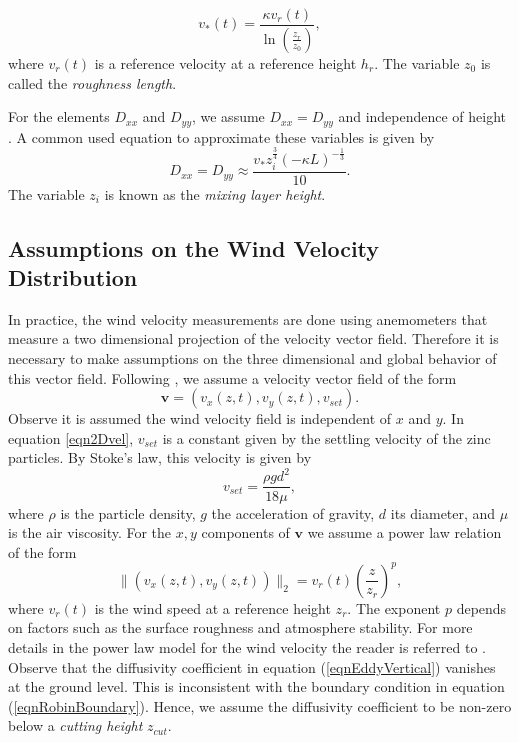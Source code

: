 \documentclass[12pt]{book}
\newcommand{\vv}{\textbf{v}}
\begin{document}
\begin{equation*}
v_{*}(t)=\frac{\kappa v_{r}(t)}{\ln(\frac{z_{r}}{z_{0}})},
\end{equation*}
where $v_{r}(t)$ is a reference velocity at a reference height $h_{r}$. The variable $z_{0}$ 
is called the \textit{roughness length}. 

For the elements $D_{xx}$ and $D_{yy}$, we assume $D_{xx}=D_{yy}$ and independence of height 
\cite{monin1954basic}. A common used equation
to approximate these variables is given by
\begin{equation*}
D_{xx}=D_{yy}\approx \frac{v_{*}z_{i}^{\frac{3}{4}}(-\kappa L)^{-\frac{1}{3}}}{10}.
\end{equation*}
The variable $z_{i}$ is known as the \textit{mixing layer height}.

\subsection{Assumptions on the Wind Velocity Distribution}
In practice, the wind velocity measurements are done using anemometers that  
measure a two dimensional projection of the   velocity vector field.
Therefore
it is necessary to make assumptions on the three dimensional and global behavior of this vector field.
Following \cite{hosseini2016airborne}, we assume a velocity vector field of the form 
\begin{equation}\label{eqn2Dvel}
\vv=(v_{x}(z,t),v_{y}(z,t),v_{set}).
\end{equation}
Observe it is assumed  the wind velocity field is independent of $x$ and $y$.
In equation \ref{eqn2Dvel}, $v_{set}$ is a constant given by  the settling velocity of the zinc particles. By Stoke's law,
this velocity is given by
\begin{equation*}
v_{set}=\frac{\rho g d^{2}}{18\mu},
\end{equation*}
where $\rho$ is the particle density, $g$ the acceleration of gravity,  $d$ its diameter, and
$\mu$ is the air viscosity. For the $x,y$ components of $\vv$ we assume a power law relation of the form
\begin{equation}\label{eqnPowerLaw}
\|(v_{x}(z,t),v_{y}(z,t))\|_{2}=v_{r}(t)\left(\frac{z}{z_{r}}\right)^{p},
\end{equation}
where $v_{r}(t)$  is the wind speed at a reference height $z_{r}$. The exponent $p$ depends on 
factors such as the surface roughness and atmosphere stability. For more details in the power
law model for the wind velocity the reader is referred to \cite{seinfeld1998atmospheric}.
\newline
Observe that the  diffusivity coefficient in equation (\ref{eqnEddyVertical}) vanishes
at the ground level. This is inconsistent with the boundary condition in equation (\ref{eqnRobinBoundary}).
Hence, we assume the diffusivity coefficient to be non-zero below a \textit{cutting height} $z_{cut}$.
\end{document}

